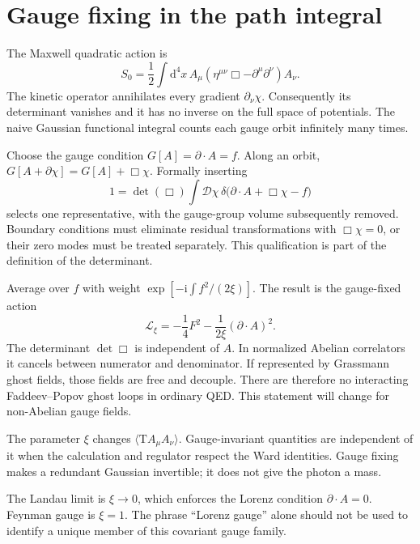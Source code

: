 \documentclass[11pt]{article}
\newcommand{\dd}{\mathrm d}
\newcommand{\ii}{\mathrm i}
\newcommand{\Lag}{\mathcal L}
\newcommand{\D}{\mathcal D}
\newcommand{\Tord}{\mathrm T}
\newcommand{\module}[1]{\clearpage\section{#1}}
\begin{document}
\module{Gauge fixing in the path integral}
The Maxwell quadratic action is
\begin{equation}
 S_0=\frac12\int\dd^4x\, A_\mu
 (\eta^{\mu\nu}\Box-\partial^\mu\partial^\nu)A_\nu.
\end{equation}
The kinetic operator annihilates every gradient \(\partial_\nu\chi\).
Consequently its determinant vanishes and it has no inverse on the full
space of potentials. The naive Gaussian functional integral counts each
gauge orbit infinitely many times.

Choose the gauge condition \(G[A]=\partial\cdot A=f\). Along an orbit,
\(G[A+\partial\chi]=G[A]+\Box\chi\). Formally inserting
\begin{equation}
 1=\det(\Box)\int\D\chi\,
 \delta\bigl(\partial\cdot A+\Box\chi-f\bigr)
\end{equation}
selects one representative, with the gauge-group volume subsequently
removed. Boundary conditions must eliminate residual transformations
with \(\Box\chi=0\), or their zero modes must be treated separately.
This qualification is part of the definition of the determinant.

Average over \(f\) with weight
\(\exp[-\ii\int f^2/(2\xi)]\). The result is the gauge-fixed action
\begin{equation}
 \Lag_\xi=-\frac14F^2-\frac1{2\xi}(\partial\cdot A)^2.
 \label{eq:gaugefix}
\end{equation}
The determinant \(\det\Box\) is independent of \(A\). In normalized Abelian
correlators it cancels between numerator and denominator. If represented
by Grassmann ghost fields, those fields are free and decouple. There are
therefore no interacting Faddeev--Popov ghost loops in ordinary QED.
This statement will change for non-Abelian gauge fields.

\begin{keyidea}
The parameter \(\xi\) changes \(\langle\Tord A_\mu A_\nu\rangle\).
Gauge-invariant quantities are independent of it when the calculation
and regulator respect the Ward identities. Gauge fixing makes a redundant
Gaussian invertible; it does not give the photon a mass.
\end{keyidea}
The Landau limit is \(\xi\to0\), which enforces the Lorenz condition
\(\partial\cdot A=0\). Feynman gauge is \(\xi=1\). The phrase
``Lorenz gauge'' alone should not be used to identify a unique member of
this covariant gauge family.
\end{document}
